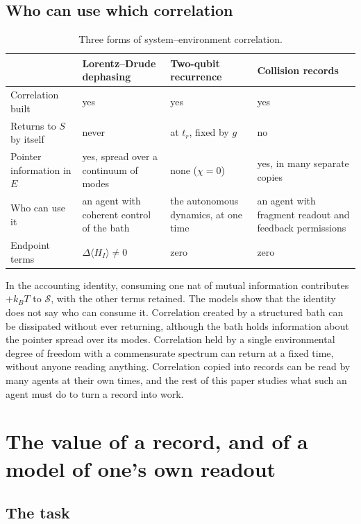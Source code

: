 \documentclass[12pt]{article}
\begin{document}
\subsection{Who can use which correlation}

\begin{table}[ht]
\centering
\small
\begin{tabular}{P{3.1cm}P{3.5cm}P{3.5cm}P{3.6cm}}
\toprule
 & Lorentz--Drude dephasing & Two-qubit recurrence & Collision records \\
\midrule
Correlation built & yes & yes & yes \\
Returns to $S$ by itself & never & at $t_r$, fixed by $g$ & no \\
Pointer information in $E$ & yes, spread over a continuum of modes & none ($\chi=0$) & yes, in many separate copies \\
Who can use it & an agent with coherent control of the bath & the autonomous dynamics, at one time & an agent with fragment readout and feedback permissions \\
Endpoint terms & $\Delta\langle H_I\rangle\ne0$ & zero & zero \\
\bottomrule
\end{tabular}
\caption{Three forms of system--environment correlation.}
\label{tab:correlations}
\end{table}

In the accounting identity, consuming one nat of mutual information contributes $+k_BT$ to $\mathcal S$, with the other terms retained. The models show that the identity does not say who can consume it. Correlation created by a structured bath can be dissipated without ever returning, although the bath holds information about the pointer spread over its modes. Correlation held by a single environmental degree of freedom with a commensurate spectrum can return at a fixed time, without anyone reading anything. Correlation copied into records can be read by many agents at their own times, and the rest of this paper studies what such an agent must do to turn a record into work.

\section{The value of a record, and of a model of one's own readout}
\label{sec:value}

\subsection{The task}
\end{document}
